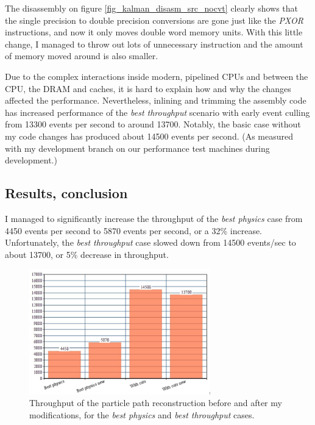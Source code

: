 \documentclass[12pt]{article}
\begin{document}
The disassembly on figure \ref{fig_kalman_disasm_src_nocvt} clearly shows that the single precision to double precision conversions are gone just like the \textit{PXOR} instructions, and now it only moves double word memory units. With this little change, I managed to throw out lots of unnecessary instruction and the amount of memory moved around is also smaller.

Due to the complex interactions inside modern, pipelined CPUs and between the CPU, the DRAM and caches, it is hard to explain how and why the changes affected the performance. Nevertheless, inlining and trimming the assembly code has increased performance of the \textit{best throughput} scenario with early event culling from 13300 events per second to around 13700. Notably, the basic case without my code changes has produced about 14500 events per second. \small (As measured with my development branch on our performance test machines during development.) \normalsize



\subsection{Results, conclusion}

I managed to significantly increase the throughput of the \textit{best physics} case from 4450 events per second to 5870 events per second, or a 32\% increase. Unfortunately, the \textit{best throughput} case slowed down from 14500 events/sec to about 13700, or 5\% decrease in throughput.

\begin{figure}[H]
	\begin{center}
		\includegraphics[width=0.7\textwidth]{kalmanfit_throughput_results_lowquality}
	\end{center}
	\caption{Throughput of the particle path reconstruction before and after my modifications, for the \textit{best physics} and \textit{best throughput} cases.}
	\label{fig_kalmanfit_results_throughput}
\end{figure}
\end{document}
